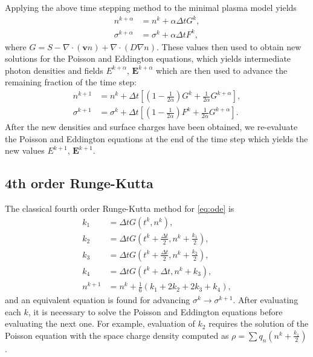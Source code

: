 \documentclass[3p]{elsarticle}
\begin{document}
Applying the above time stepping method to the minimal plasma model yields
\begin{subequations}
  \begin{align}
    n^{k+\alpha} &= n^k + \alpha\Delta t G^k, \\
    \sigma^{k+\alpha} &= \sigma^k + \alpha \Delta t F^k,
  \end{align}
\end{subequations}
where $G = S - \nabla\cdot(\bm{v} n) + \nabla\cdot(D\nabla n)$. These values then used to obtain new solutions for the Poisson and Eddington equations, which yields intermediate photon densities and fields $E^{k+\alpha}$, $\bm{E}^{k+\alpha}$ which are then used to advance the remaining fraction of the time step:
\begin{subequations}
  \begin{align}
    n^{k+1} &= n^k + \Delta t\left[\left(1 - \frac{1}{2\alpha}\right)G^k + \frac{1}{2\alpha}G^{k+\alpha}\right], \\
    \sigma^{k+1} &= \sigma^k + \Delta t\left[\left(1 - \frac{1}{2\alpha}\right)F^k + \frac{1}{2\alpha}G^{k+\alpha}\right].
  \end{align}
\end{subequations}
After the new densities and surface charges have been obtained, we re-evaluate the Poisson and Eddington equations at the end of the time step which yields the new values $E^{k+1}$, $\bm{E}^{k+1}$.

\subsection{4th order Runge-Kutta}
The classical fourth order Runge-Kutta method for \eqref{eq:ode} is
\begin{subequations}
  \begin{align}
    k_1 &= \Delta tG\left(t^k, n^k\right), \\
    k_2 &= \Delta tG\left(t^k+\frac{\Delta t}{2}, n^k + \frac{k_1}{2}\right), \\
    k_3 &= \Delta tG\left(t^k+\frac{\Delta t}{2}, n^k + \frac{k_2}{2}\right), \\
    k_4 &= \Delta tG\left(t^k+\Delta t, n^k + k_3\right), \\
    n^{k+1}  &= n^k + \frac{1}{6}\left(k_1 + 2k_2 + 2k_3 + k_4\right),
  \end{align}
\end{subequations}
and an equivalent equation is found for advancing $\sigma^k\rightarrow \sigma^{k+1}$. After evaluating each $k$, it is necessary to solve the Poisson and Eddington equations before evaluating the next one. For example, evaluation of $k_2$ requires the solution of the Poisson equation with the space charge density computed as $\rho = \sum q_n\left(n^k + \frac{k_1}{2}\right)$. 
\end{document}
